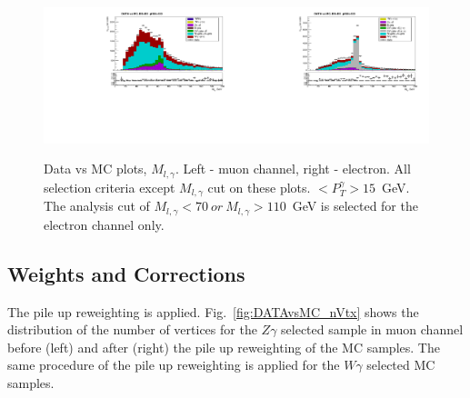 \begin{figure}[htb]
  \begin{center}
   \includegraphics[width=0.5\textwidth]{../figs/figs_v11/MUON_WGamma/PrepareYields/c_TotalDATAvsMC_EtaCommon__Mpholep1_pt15to500_.pdf}\includegraphics[width=0.5\textwidth]{../figs/figs_v11/ELECTRON_WGamma/PrepareYields/c_TotalDATAvsMC_EtaCommon__Mpholep1PRELIMINARY_FOR_E_TO_GAMMA_WITH_PSV_CUT_pt15to500_.pdf}
  \caption{Data vs MC plots, $M_{l,\gamma}$. Left - muon channel, right - electron. All selection criteria except $M_{l,\gamma}$ cut on these plots. $<P_T^{\gamma}>15$~GeV. The analysis cut of $M_{l,\gamma}<70~or~M_{l,\gamma}>110$~GeV is selected for the electron channel only.}
  \label{fig:DATAvsMC_Mpholep1}
  \end{center}
\end{figure}

\subsection{Weights and Corrections}

The pile up reweighting is applied. Fig.~\ref{fig:DATAvsMC_nVtx} shows the distribution of the number of vertices for the $Z\gamma$ selected sample in muon channel before (left) and after (right) the pile up reweighting of the MC samples. The same procedure of the pile up reweighting is applied for the $W\gamma$ selected MC samples.

